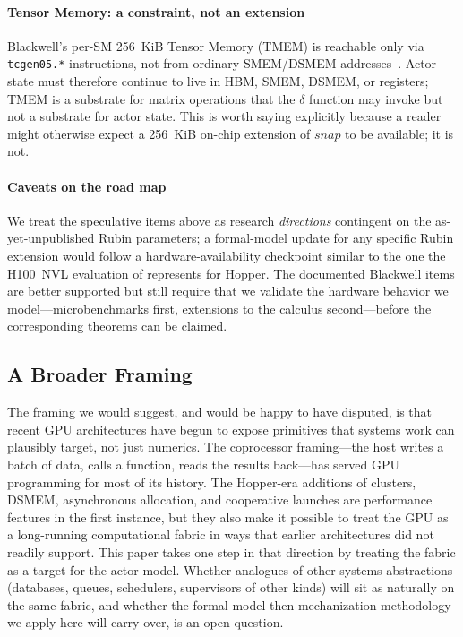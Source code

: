 \paragraph{Tensor Memory: a constraint, not an extension}
Blackwell's per-SM 256~KiB Tensor Memory (TMEM) is reachable only
via \texttt{tcgen05.*} instructions, not from ordinary
SMEM/DSMEM addresses~\citep{microbench-blackwell}.  Actor state
must therefore continue to live in HBM, SMEM, DSMEM, or
registers; TMEM is a substrate for matrix operations that the
\(\delta\) function may invoke but not a substrate for actor
state.  This is worth saying explicitly because a reader might
otherwise expect a 256~KiB on-chip extension of \(\mathit{snap}\)
to be available; it is not.

\paragraph{Caveats on the road map}
We treat the speculative items above as research \emph{directions}
contingent on the as-yet-unpublished Rubin parameters; a
formal-model update for any specific Rubin extension would follow a
hardware-availability checkpoint similar to the one the H100~NVL
evaluation of  represents for Hopper.  The
documented Blackwell items are better supported but still require
that we validate the hardware behavior we model—microbenchmarks
first, extensions to the calculus second—before the corresponding
theorems can be claimed.

\subsection{A Broader Framing}
\label{sec:disc:big}

The framing we would suggest, and would be happy to have disputed,
is that recent GPU architectures have begun to expose primitives
that systems work can plausibly target, not just numerics.  The
coprocessor framing---the host writes a batch of data, calls a
function, reads the results back---has served GPU programming for
most of its history.  The Hopper-era additions of clusters, DSMEM,
asynchronous allocation, and cooperative launches are performance
features in the first instance, but they also make it possible to
treat the GPU as a long-running computational fabric in ways that
earlier architectures did not readily support.  This paper takes
one step in that direction by treating the fabric as a target for
the actor model.  Whether analogues of other systems abstractions
(databases, queues, schedulers, supervisors of other kinds) will
sit as naturally on the same fabric, and whether the
formal-model-then-mechanization methodology we apply here will
carry over, is an open question.
